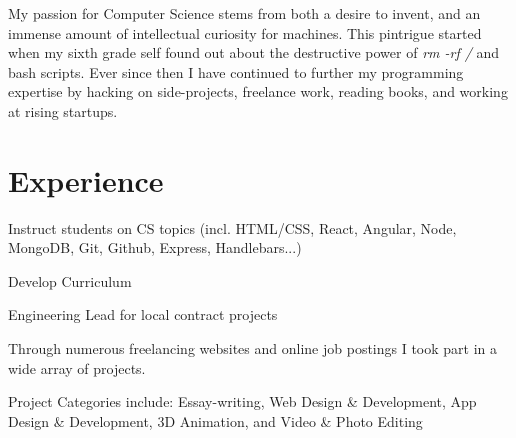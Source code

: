 \documentclass[letterpaper]{deedy-resume} %
\begin{document}
\begin{minipage}[t]{0.66\textwidth} %


  My passion for Computer Science stems from both a desire to invent,
  and an immense amount of intellectual curiosity for machines. This
  pintrigue started when my sixth grade self found
  out about the destructive power of {\it rm -rf /} and bash scripts.
  Ever since then I have continued to further my programming
  expertise by hacking on side-projects, freelance work,
  reading books, and working at rising startups.
  


  \section{Experience}



  \begin{tightitemize}
  \item Instruct students on CS topics (incl. HTML/CSS, React, Angular, Node, MongoDB, Git, Github, Express, Handlebars...)
  \item Develop Curriculum
  \item Engineering Lead for local contract projects
  \end{tightitemize}

  \sectionspace %



  \begin{tightitemize}
  \item Through numerous freelancing websites and online job postings I took part in a wide array of projects.
  \item Project Categories include: Essay-writing, Web Design \& Development, App Design \& Development, 3D Animation, and Video \& Photo Editing
  \end{tightitemize}


\end{minipage}
\end{document}
